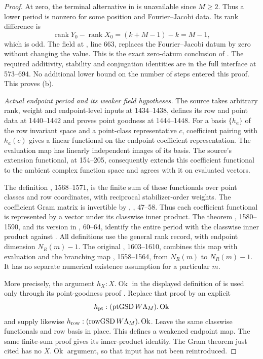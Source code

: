 \documentclass[11pt,a4paper]{article}
\theoremstyle{definition}\newtheorem{remark}[theorem]{Remark}
\begin{document}
\begin{proof}
At zero, the terminal alternative in  is unavailable since
$M\ge2$. Thus a lower period is nonzero for some position and
Fourier--Jacobi data. Its rank difference is
\[
 \operatorname{rank}Y_0-\operatorname{rank}X_0
       =(k+M-1)-k=M-1,
\]
which is odd. The field  at
, line 663, replaces the Fourier--Jacobi datum by zero
without changing the value. This is the exact zero-datum conclusion of
. The required additivity, stability and conjugation
identities are in the full  interface at 573--694.
No additional lower bound on the number of steps entered this proof.
This proves (b).

\textit{Actual endpoint period and its weaker field hypotheses.}
The source  takes arbitrary
rank, weight and endpoint-level inputs at 1434--1438, defines its row and
point data at 1440--1442 and proves point goodness at 1444--1448.
For a basis $\{h_a\}$ of the row invariant space and a point-class
representative $c$, coefficient pairing with $h_a(c)$ gives a linear
functional on the endpoint coefficient representation.
The evaluation map has linearly independent images of its basis.
The source's extension functional, at 154--205, consequently extends
this coefficient functional to the ambient complex function space and
agrees with it on evaluated vectors.

The definition , 1568--1571, is the finite sum of these
functionals over point classes and row coordinates, with reciprocal
stabilizer-order weights.
The coefficient Gram matrix is invertible by
, , 47--58.
Thus each coefficient functional is represented by a vector under its
classwise inner product. The theorem
, 1580--1590, and its version in
, 60--64, identify the entire period with the
classwise inner product against .
All definitions use the general rank record, with endpoint dimension
$N_R(m)-1$.
The original , 1603--1610, combines this map with evaluation
and the branching map , 1558--1564, from $N_R(m)$ to $N_R(m)-1$.
It has no separate numerical existence assumption for a particular $m$.

More precisely, the argument $h_X:X.\operatorname{Ok}$ in the displayed
definition of  is used only through its point-goodness
proof .
Replace that proof by an explicit
\[
 h_{\rm pt}:(\operatorname{ptGSD}W\Lambda_M).\operatorname{Ok}
\]
and supply likewise
$h_{\rm row}:(\operatorname{rowGSD}W\Lambda_M).\operatorname{Ok}$.
Leave the same classwise functionals and row basis in place.
This defines a weakened endpoint map.
The same finite-sum proof gives its inner-product identity.
The Gram theorem just cited has no $X.\operatorname{Ok}$ argument,
so that input has not been reintroduced.


\end{proof}
\end{document}
